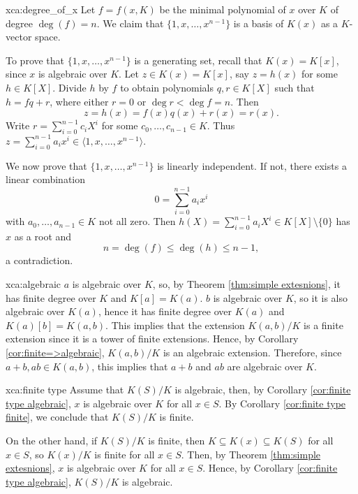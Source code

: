\begin{sol}{xca:degree_of_x}
    Let $f=f(x,K)$ be the minimal polynomial of $x$ over $K$ of degree $\deg(f)=n$.
    We claim that $\{1,x,\dots, x^{n-1}\}$ is a basis of $K(x)$ as a $K$-vector space. 

    To prove that $\{1,x,\dots, x^{n-1}\}$ is a generating set, recall that $K(x)=K[x]$, since $x$ is algebraic over $K$. 
    Let $z\in K(x)=K[x]$, say $z=h(x)$ for some $h\in K[X]$. 
    Divide $h$ by $f$ to obtain polynomials $q,r\in K[X]$ 
    such that $h=fq+r$, where either $r=0$ or $\deg r<\deg f=n$. Then 
    \[
		z=h(x)=f(x)q(x)+r(x)=r(x).
	\]
	Write $r=\sum_{i=0}^{n-1}c_iX^i$ for some $c_0,\dots,c_{n-1}\in K$. 
    Thus $z=\sum_{i=0}^{n-1}a_ix^i\in \langle 1,x,\dots,x^{n-1}\rangle$.
        
    We now prove that $\{1,x,\dots, x^{n-1}\}$ is linearly independent. If not, 
    there exists a linear combination
    \[
    0=\sum_{i=0}^{n-1}a_ix^i
    \]
    with $a_0,\dots,a_{n-1}\in K$ not all zero. 
    Then $h(X)=\sum_{i=0}^{n-1}a_iX^i\in K[X]\setminus\{0\}$
    has $x$ as a root and 
        \[
        n=\deg(f)\leq \deg(h)\leq n-1,
        \]
       a contradiction. 
\end{sol}

\begin{sol}{xca:algebraic}
$a$ is algebraic over $K$, 
so, by Theorem \ref{thm:simple extesnions},
it has finite degree over $K$
and $K[a]=K(a)$.
$b$ is algebraic over $K$,
so it is also algebraic over $K(a)$, hence it has finite degree over $K(a)$ and 
$K(a)[b]=K(a,b)$.
This implies that the extension
$K(a,b)/K$ is a finite extension
since it is a tower of finite extensions.
Hence, by Corollary \ref{cor:finite=>algebraic}, $K(a,b)/K$ is an algebraic extension.
Therefore, since $a+b,ab\in K(a,b)$,
this implies that $a+b$ and $ab$
are algebraic over $K$.
\end{sol}

\begin{sol}{xca:finite type}
    Assume that $K(S)/K$ is algebraic, then, by Corollary \ref{cor:finite type algebraic}, 
    $x$ is algebraic over $K$ for all $x\in S$.
    By Corollary \ref{cor:finite type finite}, we conclude that $K(S)/K$ is finite.

    On the other hand, if $K(S)/K$ is finite, then
    $K\subseteq K(x)\subseteq K(S)$ for all $x\in S$, so
    $K(x)/K$ is finite for all $x\in S$.
    Then, by Theorem \ref{thm:simple extesnions},
    $x$ is algebraic over $K$ for all $x\in S$.
    Hence, by Corollary \ref{cor:finite type algebraic}, $K(S)/K$ is algebraic.
 \end{sol}

